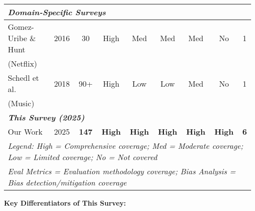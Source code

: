 \begin{table*}[ht]
\begin{tabular}{@{}lcccccccc@{}}
\midrule
\multicolumn{9}{l}{\textit{\textbf{Domain-Specific Surveys}}} \\
\midrule
Gomez-Uribe \& Hunt & 2016 & 30 & High & Med & Med & Med & No & 1 \\
(Netflix) & & & & & & & & \\
Schedl et al. & 2018 & 90+ & High & Low & Low & Med & No & 1 \\
(Music) & & & & & & & & \\
\midrule
\multicolumn{9}{l}{\textbf{\textit{This Survey (2025)}}} \\
\midrule
Our Work & 2025 & \textbf{147} & \textbf{High} & \textbf{High} & \textbf{High} & \textbf{High} & \textbf{High} & \textbf{6} \\
\bottomrule
\multicolumn{9}{l}{\scriptsize \textit{Legend: High = Comprehensive coverage; Med = Moderate coverage; Low = Limited coverage; No = Not covered}} \\
\multicolumn{9}{l}{\scriptsize \textit{Eval Metrics = Evaluation methodology coverage; Bias Analysis = Bias detection/mitigation coverage}} \\
\end{tabular}
\end{table*}

\textbf{Key Differentiators of This Survey:}

